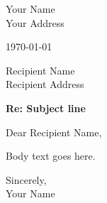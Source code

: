 \documentclass[11pt,a4paper]{article}
\newcommand{\senderName}{Your Name}
\newcommand{\senderAddress}{Your Address}
\newcommand{\recipientName}{Recipient Name}
\newcommand{\recipientAddress}{Recipient Address}
\newcommand{\letterDate}{\today}
\newcommand{\letterSubject}{Subject line}
\begin{document}
\begin{flushright}
\senderName \\
\senderAddress
\end{flushright}

\letterDate

\recipientName \\
\recipientAddress

\vspace{0.5cm}
\textbf{Re: \letterSubject}

\vspace{0.3cm}
Dear \recipientName,

Body text goes here.

Sincerely, \\
\senderName
\end{document}
